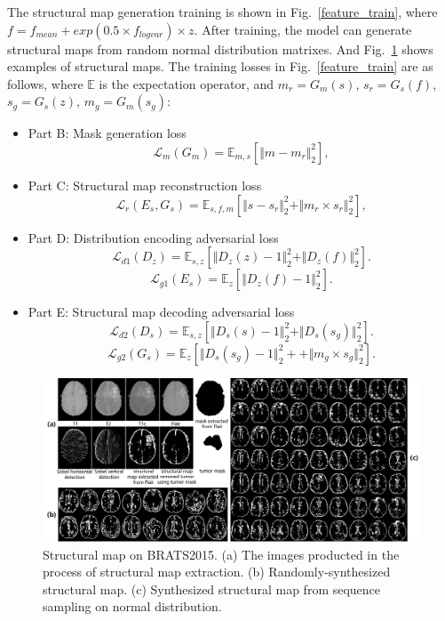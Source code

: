 \documentclass[runningheads]{llncs}
\begin{document}
	The structural map generation training is shown in Fig.~\ref{feature_train}, where $f=f_{mean}+exp(0.5\times f_{logvar})\times z$. After training, the model can generate structural maps from random normal distribution matrixes. And Fig.~\ref{generated_f} shows examples of structural maps. The training losses in Fig.~\ref{feature_train} are as follows, where $\mathbb{E}$ is the expectation operator, and $m_r=G_m(s)$, $s_r=G_s(f)$, $s_g=G_s(z)$, $m_g=G_m(s_g)$: 
	\begin{itemize}
		\item{Part B: Mask generation loss}
		\begin{equation}
		\mathcal{L}_{m}(G_m)=\mathbb{E}_{m,s}[\Vert{m-m_r}\Vert_{2}^{2}],
		\end{equation}
		\item{Part C: Structural map reconstruction loss} 
		\begin{equation}
		\mathcal{L}_{r}(E_s,G_s)=\mathbb{E}_{s,f,m}[\Vert{s-s_r}\Vert_{2}^{2}+\Vert{m_r\times s_r}\Vert_{2}^{2}],
		\end{equation}
		\item{Part D: Distribution encoding adversarial loss} 
		\begin{equation}
		\mathcal{L}_{d1}(D_{z})=\mathbb{E}_{s,z}[\Vert{D_{z}(z)-1}\Vert_{2}^{2}+\Vert{D_{z}(f)}\Vert_{2}^{2}].
		\end{equation}
		\begin{equation}
		\mathcal{L}_{g1}(E_s)=\mathbb{E}_{z}[\Vert{D_{z}(f)-1}\Vert_{2}^{2}].	
		\end{equation}
		\item{Part E: Structural map decoding adversarial loss} 
		\begin{equation}
		\mathcal{L}_{d2}(D_{s})=\mathbb{E}_{s,z}[\Vert{D_{s}(s)-1}\Vert_{2}^{2}+\Vert{D_{s}(s_g)}\Vert_{2}^{2}].
		\end{equation}
		\begin{equation}
		\mathcal{L}_{g2}(G_s)=\mathbb{E}_{z}[\Vert{D_{s}(s_g)-1}\Vert_{2}^{2}++\Vert{m_g\times s_g}\Vert_{2}^{2}].	
		\end{equation}
	\end{itemize}
	\begin{figure}[th]
		\centering
		\includegraphics[width=1\linewidth]{figures/brats_f}
		\caption{Structural map on BRATS2015. (a) The images producted in the process of structural map extraction. (b) Randomly-synthesized structural map. (c) Synthesized structural map from sequence sampling on normal distribution.}
		\label{generated_f}
	\end{figure}
\end{document}
